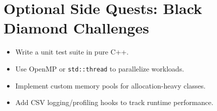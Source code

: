 \documentclass[12pt]{article}
\begin{document}
\section*{Optional Side Quests: Black Diamond Challenges}
\begin{itemize}[leftmargin=*]
    \item Write a unit test suite in pure C++.
    \item Use OpenMP or \texttt{std::thread} to parallelize workloads.
    \item Implement custom memory pools for allocation-heavy classes.
    \item Add CSV logging/profiling hooks to track runtime performance.
\end{itemize}
\end{document}
